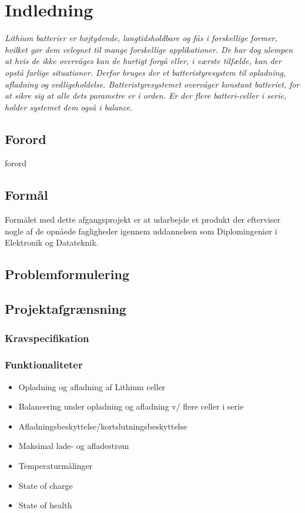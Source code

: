 \chapter{Indledning}

\emph{Lithium batterier er højtydende, langtidsholdbare og fås i forskellige former, hvilket gør dem velegnet til mange forskellige applikationer. De har dog ulempen at hvis de ikke overvåges kan de hurtigt forgå eller, i værste tilfælde, kan der opstå farlige situationer. Derfor bruges der et batteristyresystem til opladning, afladning og vedligeholdelse. Batteristyresystemet overvåger konstant batteriet, for at sikre sig at alle dets parametre er i orden. Er der flere batteri-celler i serie, holder systemet dem også i balance. }

\section{Forord}\label{sec:forord}
forord

\section{Formål}
Formålet med dette afgangsprojekt er at udarbejde et produkt der efterviser nogle af de opnåede fagligheder igennem uddannelsen som Diplomingeniør i Elektronik og Datateknik.

\section{Problemformulering}


\section{Projektafgrænsning}
\subsection{Kravspecifikation} \label{afs:kravspecifikation}
\subsection{Funktionaliteter}

\begin{itemize}
	\item Opladning og afladning af Lithium celler
	\item Balancering under opladning og afladning v/ flere celler i serie
	\item Afladningsbeskyttelse/kortslutningsbeskyttelse
	\item Maksimal lade- og afladestrøm
	\item Temperaturmålinger
	\item State of charge
	\item State of health
\end{itemize}

